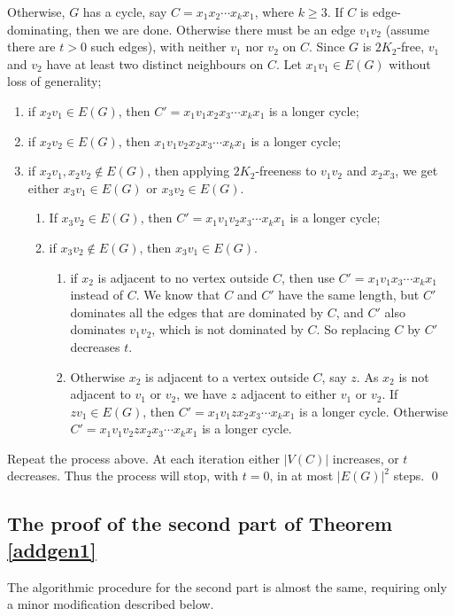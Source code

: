 \documentclass[runningheads,a4paper]{llncs}
\begin{document}
Otherwise, $G$ has a cycle, say $C=x_1x_2\cdots x_kx_1$, where $k\ge3$.
If $C$ is edge-dominating, then we are done.
Otherwise
there must be an edge $v_1v_2$ (assume there are $t>0$ such edges),
with neither $v_1$ nor $v_2$ on $C$.
Since $G$ is $2K_2$-free, $v_1$ and $v_2$ have at least two distinct neighbours on $C$.
Let $x_1v_1\in E(G)$ without loss of generality;
\begin{enumerate}
\item if $x_2v_1\in E(G)$, then $C'=x_1v_1x_2x_3\cdots x_kx_1$ is a longer cycle;
\item if $x_2v_2\in E(G)$, then $x_1v_1v_2x_2x_3\cdots x_kx_1$ is a longer cycle;
\item if $x_2v_1,x_2v_2\not\in E(G)$, then applying $2K_2$-freeness to $v_1v_2$ and $x_2x_3$,
we get either $x_3v_1\in E(G)$ or $x_3v_2\in E(G)$.
\begin{enumerate}
\item If $x_3v_2\in E(G)$, then $C'=x_1v_1v_2x_3\cdots x_kx_1$ is a longer cycle;
\item if $x_3v_2\not\in E(G)$, then $x_3v_1\in E(G)$.
\begin{enumerate}
\item if $x_2$ is adjacent to no vertex outside $C$, then use $C'=x_1v_1x_3\cdots x_kx_1$ instead of $C$.
We know that $C$ and $C'$ have the same length, but $C'$ dominates all the edges that
are dominated by $C$, and $C'$ also dominates $v_1v_2$, which is not dominated by $C$. So replacing $C$ by $C'$
decreases $t$.
\item Otherwise $x_2$ is adjacent to a vertex outside $C$, say $z$.
As $x_2$ is not adjacent to $v_1$ or $v_2$, we have $z$ adjacent to either $v_1$ or $v_2$. If $zv_1\in E(G)$, then $C'=x_1v_1zx_2x_3\cdots x_kx_1$ is a longer cycle.
Otherwise $C'=x_1v_1v_2zx_2x_3\cdots x_kx_1$ is a longer cycle.
\end{enumerate}
\end{enumerate}
\end{enumerate}
Repeat the process above. At each iteration either $|V(C)|$ increases, or $t$ decreases.
Thus the process will stop, with $t=0$, in at most $|E(G)|^2$ steps.
\qed

\subsection{The proof of the second part of Theorem  \ref{addgen1}}
The algorithmic procedure for the second part is almost the same, requiring only a minor
modification described below.
\end{document}
